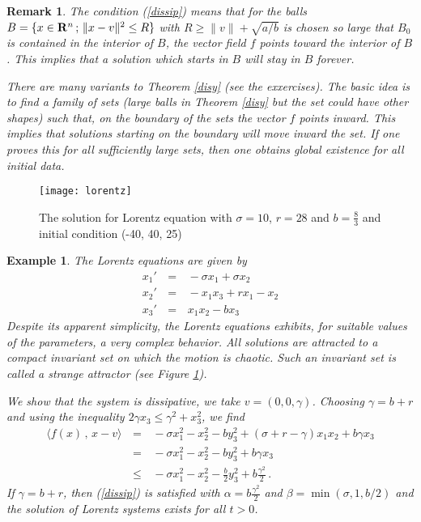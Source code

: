 \documentclass[12pt]{report}
\newcommand{\bR}{{\bf R}}
\newtheorem{remark}[theorem]{Remark}
\newtheorem{example}[theorem]{Example}
\newcommand{\nn}{\nonumber}
\def\eqref#1{(\ref{#1})}
\begin{document}
\begin{remark}{\rm The condition \eqref{dissip} means that for the balls 
$B =\{ x \in \bR^n\,;\, \|x-v\|^2 \le R \}$ with $R \ge \|v\| +
\sqrt{a/b}$ is chosen so large that $B_0$ is contained in the interior
of $B$, the vector field $f$ points toward the interior of $B$. This
implies that a solution which starts in $B$ will stay in $B$ forever.

There are many variants to Theorem \ref{disy} (see the exxercises).  The
basic idea is to find a family of sets (large balls in Theorem
\ref{disy} but the set could have other shapes) such that, on
the boundary of the sets the vector $f$ points inward. This implies
that solutions starting on the boundary will move inward the set. If one 
proves this for all sufficiently large sets, then one obtains global 
existence for all initial data.  
}\end{remark}

\begin{figure}[htbp]
\begin{center}
\texttt{[image: lorentz]}
\caption{The solution for Lorentz equation with $\sigma=10$, $r=28$
and $b=\frac{8}{3}$ and initial condition (-40, 40, 25) }
\label{lorentz}
\end{center}
\end{figure}


\begin{example}{\rm  
The Lorentz equations are given by 
\begin{eqnarray}
x_1'\,&=& \,  - \sigma x_1 + \sigma x_2      \nn \\
x_2'\,&=& \,  - x_1 x_3 + r x_1 -x_2      \nn \\
x_3'\,&=& \,   x_1 x_2 - bx_3     
\end{eqnarray}
Despite its apparent simplicity, the Lorentz equations exhibits, for
suitable values of the parameters, a very complex behavior. All
solutions are attracted to a compact invariant set on which the motion
is chaotic. Such an invariant set is called a strange attractor (see
Figure \ref{lorentz}).

We show that the system is dissipative, we take $v = (0,0, \gamma)$.
Choosing $\gamma = b+r$ and using the inequality $2\gamma x_3 \le
\gamma^2 + x_3^2$, we find
\begin{eqnarray}
\langle f(x)\,,\, x-v \rangle\,&=&\, - \sigma x_1^2 - x_2^2 -b y_3^2 + 
(\sigma + r - \gamma) x_1 x_2 + b\gamma x_3 \nn \\
\,&=&\, - \sigma x_1^2 - x_2^2 -b y_3^2 + b\gamma x_3 \nn \\
\,&\le& \, - \sigma x_1^2 - x_2^2 -\frac{b}{2}y_3^2 + b\frac{\gamma^2}{2} \,.
\end{eqnarray}
If $\gamma = b+r$, then \eqref{dissip} is satisfied with $\alpha=
b\frac{\gamma^2}{2} $ and $\beta = \min( \sigma, 1, b/2)$ and the
solution of Lorentz systems exists for all $t >0$.  }
\end{example}
\end{document}
